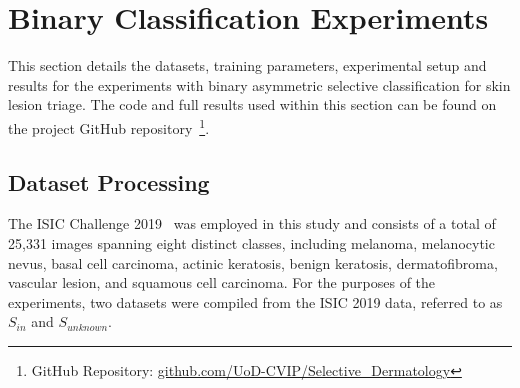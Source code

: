 \section{Binary Classification Experiments}
\label{sec:selective_binary_experiment}
This section details the datasets, training parameters, experimental setup and results for the experiments with binary asymmetric selective classification for skin lesion triage. The code and full results used within this section can be found on the project GitHub repository~\footnote{GitHub Repository: \url{github.com/UoD-CVIP/Selective_Dermatology}}.

\subsection{Dataset Processing}
\label{subsec:selective_binary_dataset}
The ISIC Challenge 2019~\citep{codella2018skin,combalia2019bcn20000,tschandl2018ham10000} was employed in this study and consists of a total of 25,331 images spanning eight distinct classes, including melanoma, melanocytic nevus, basal cell carcinoma, actinic keratosis, benign keratosis, dermatofibroma, vascular lesion, and squamous cell carcinoma. For the purposes of the experiments, two datasets were compiled from the ISIC 2019 data, referred to as $S_{in}$ and $S_{unknown}$.

